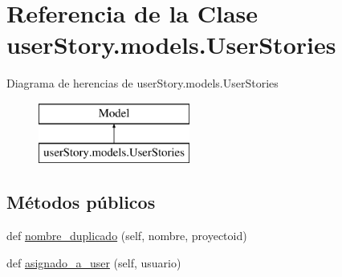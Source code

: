 \hypertarget{classuser_story_1_1models_1_1_user_stories}{}\section{Referencia de la Clase user\+Story.\+models.\+User\+Stories}
\label{classuser_story_1_1models_1_1_user_stories}
Diagrama de herencias de user\+Story.\+models.\+User\+Stories\begin{figure}[H]
\begin{center}
\leavevmode
\includegraphics[height=2.000000cm]{classuser_story_1_1models_1_1_user_stories}
\end{center}
\end{figure}
\subsection*{Métodos públicos}
\begin{DoxyCompactItemize}
\item 
def \hyperlink{classuser_story_1_1models_1_1_user_stories_a1b9d750558d9ba1d62ac8f9a8df8026a}{nombre\+\_\+duplicado} (self, nombre, proyectoid)
\item 
def \hyperlink{classuser_story_1_1models_1_1_user_stories_a2556b581ec600d9b6b2a6dea04454bd8}{asignado\+\_\+a\+\_\+user} (self, usuario)
\end{DoxyCompactItemize}
